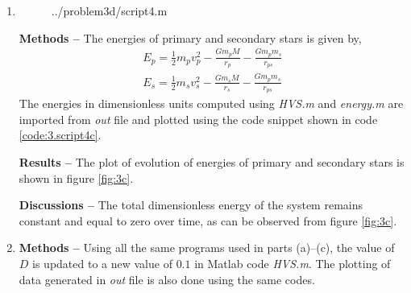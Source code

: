 \documentclass[a4paper]{article}
\begin{document}
\begin{enumerate} [label*=\textbf{(\alph*)}]
	
				\item
					\begin{figure} [h]
						 {../problem3d/script4.m}
					\end{figure}
				
					\subitem \textbf{Methods  --}
					The energies of primary and secondary stars is given by,
					\begin{equation}
						\begin{gathered}
							E_p = \frac{1}{2} m_p v_p^2 - \frac{G m_p M}{r_p} - \frac{G m_p m_s}{r_{ps}} \\
							E_s = \frac{1}{2} m_s v_s^2 - \frac{G m_s M}{r_s} - \frac{G m_p m_s}{r_{ps}}
						\end{gathered}
					\label{eq:3-energies}
					\end{equation}
					The energies in dimensionless units computed using \emph{HVS.m} and \emph{energy.m} are imported from \emph{out} file and plotted using the code snippet shown in code \ref{code:3.script4c}. 
					
					\subitem \textbf{Results  --}
					The plot of evolution of energies of primary and secondary stars is shown in figure \ref{fig:3c}.
					
					\subitem \textbf{Discussions  --}
					The total dimensionless energy of the system remains constant and equal to zero over time, as can be observed from figure \ref{fig:3c}.
	
	
				\item
					\subitem \textbf{Methods  --}
					Using all the same programs used in parts (a)--(c), the value of \(D\) is updated to a new value of \(0.1\) in Matlab code \emph{HVS.m}. The plotting of data generated in \emph{out} file is also done using the same codes. 
					

\end{enumerate}
\end{document}

